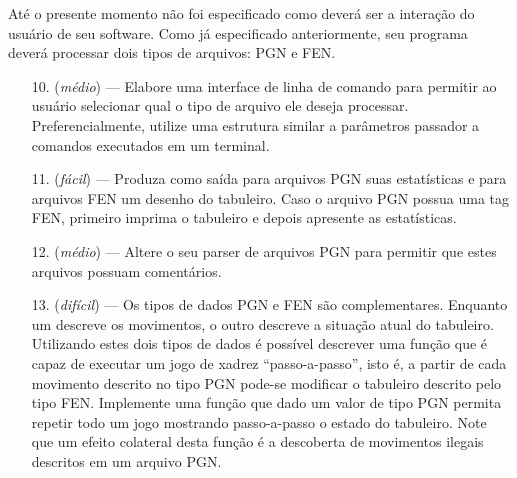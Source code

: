 \documentclass[11pt,a4paper]{article}
\begin{document}
At\'e o presente momento n\~ao foi especificado como dever\'a ser a intera\c{c}\~ao do usu\'ario de seu software.
Como j\'a especificado anteriormente, seu programa dever\'a processar dois tipos de arquivos: PGN e FEN.
\begin{itemize}
	\item [10.] (\emph{m\'edio}) --- Elabore uma interface de linha de comando para permitir ao usu\'ario selecionar
	            qual o tipo de arquivo ele deseja processar. Preferencialmente, utilize uma estrutura similar a 
	            par\^ametros passador a comandos executados em um terminal.
	\item [11. ] (\emph{f\'acil}) --- Produza como sa\'ida para arquivos PGN suas estat\'isticas e para arquivos FEN
	            um desenho do tabuleiro. Caso o arquivo PGN possua uma tag FEN, primeiro imprima o tabuleiro e depois
	            apresente as estat\'isticas.
	\item[12. ] (\emph{m\'edio}) --- Altere o seu parser de arquivos PGN para permitir que estes arquivos 
	      possuam coment\'arios.
	\item[13. ] (\emph{dif\'icil}) --- Os tipos de dados PGN e FEN s\~ao complementares. Enquanto um descreve os movimentos,
	      o outro descreve a situa\c{c}\~ao atual do tabuleiro. Utilizando estes dois tipos de dados \'e poss\'ivel
	      descrever uma fun\c{c}\~ao que \'e capaz de executar um jogo de xadrez ``passo-a-passo'', isto \'e, a
	      partir de cada movimento descrito no tipo PGN pode-se modificar o tabuleiro descrito pelo tipo FEN.
	      Implemente uma fun\c{c}\~ao que dado um valor de tipo PGN permita repetir todo um jogo mostrando passo-a-passo
	      o estado do tabuleiro. Note que um efeito colateral desta fun\c{c}\~ao \'e a descoberta de movimentos ilegais
	      descritos em um arquivo PGN.
\end{itemize}
 
\end{document}
